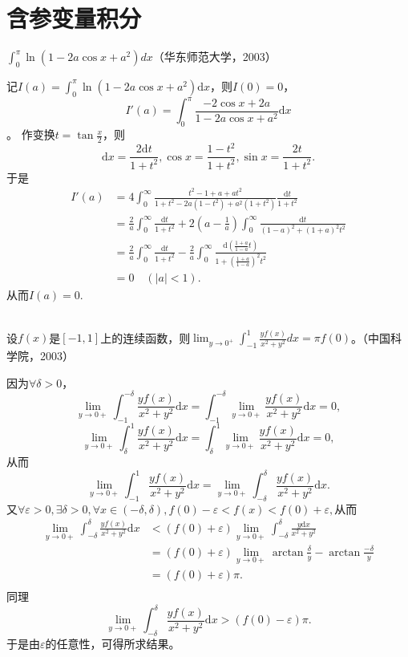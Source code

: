   \section{含参变量积分}

  \begin{exercise}
 $\displaystyle\int_0^{\pi}\ln(1-2a\cos x+a^2)dx$（华东师范大学，2003）  
  
   记$I(a)=\int_0^{\pi}\ln(1-2a\cos x+a^2)\mathrm{d}x$，则$I(0)=0$，$$I'(a)=\int_0^{\pi}\frac{-2\cos x+2a}{1-2a\cos x+a^2}\mathrm{d}x$$。
  作变换$t=\tan\frac{x}{2}$，则$$\mathrm{d}x=\frac{2\mathrm{d}t}{1+t^2},\cos x=\frac{1-t^2}{1+t^2},\sin x=\frac{2t}{1+t^2}.$$
  于是
  \begin{align*}
  I'(a)&=4\int_0^{\infty}\frac{t^2-1+a+at^2}{1+t^2-2a(1-t^2)+a^2(1+t^2)}\frac{\mathrm{d}t}{1+t^2}\\
  &=\frac{2}{a}\int_0^{\infty}\frac{\mathrm{d}t}{1+t^2}+2(a-\frac{1}{a})\int_0^{\infty}\frac{\mathrm{d}t}{(1-a)^2+(1+a)^2t^2}\\
  &=\frac{2}{a}\int_0^{\infty}\frac{\mathrm{d}t}{1+t^2}-\frac{2}{a}\int_0^{\infty}\frac{\mathrm{d}(\frac{1+a}{1-a}t)}{1+(\frac{1+a}{1-a})^2t^2}\\
  &=0\quad(|a|<1).
  \end{align*}
  从而$I(a)=0.$
 
  \end{exercise}

  \begin{exercise}
  \hfill\\
   设$f(x)$是$[-1,1]$上的连续函数，则$\displaystyle\lim_{y\rightarrow0^+}\int_{-1}^{1}\frac{yf(x)}{x^2+y^2}dx=\pi f(0)$。（中国科学院，2003） 
  
 因为$\forall\delta>0$，
$$\lim_{y\rightarrow0+}\int_{-1}^{-\delta}\frac{yf(x)}{x^2+y^2}\mathrm{d}x=\int_{-1}^{-\delta}\lim_{y\rightarrow0+}\frac{yf(x)}{x^2+y^2}\mathrm{d}x=0,$$
$$\lim_{y\rightarrow0+}\int^{1}_{\delta}\frac{yf(x)}{x^2+y^2}\mathrm{d}x=\int^{1}_{\delta}\lim_{y\rightarrow0+}\frac{yf(x)}{x^2+y^2}\mathrm{d}x=0,$$
从而
$$\lim_{y\rightarrow0+}\int_{-1}^{1}\frac{yf(x)}{x^2+y^2}\mathrm{d}x=\lim_{y\rightarrow0+}\int_{-\delta}^{\delta}\frac{yf(x)}{x^2+y^2}\mathrm{d}x.$$
又$\forall\varepsilon>0,\exists\delta>0,\forall x\in(-\delta,\delta),f(0)-\varepsilon<f(x)<f(0)+\varepsilon,$从而
\begin{align*}
\lim_{y\rightarrow0+}\int_{-\delta}^{\delta}\frac{yf(x)}{x^2+y^2}\mathrm{d}x&<(f(0)+\varepsilon)\lim_{y\rightarrow0+}\int_{-\delta}^{\delta}\frac{y\mathrm{d}x}{x^2+y^2}\\
&=(f(0)+\varepsilon)\lim_{y\rightarrow0+}\arctan\frac{\delta}{y}-\arctan\frac{-\delta}{y}\\
&=(f(0)+\varepsilon)\pi.\\
\end{align*}
同理$$\lim_{y\rightarrow0+}\int_{-\delta}^{\delta}\frac{yf(x)}{x^2+y^2}\mathrm{d}x>(f(0)-\varepsilon)\pi.$$
于是由$\varepsilon$的任意性，可得所求结果。 
  \end{exercise}

